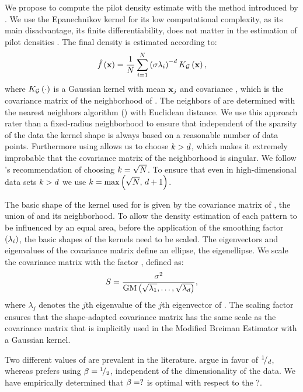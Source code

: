 We propose to compute the pilot density estimate with the method introduced by \citeauthor{wilkinson1995dataplot}. We use the Epanechnikov kernel for its low computational complexity, as its main disadvantage, its finite differentiability, does not matter in the estimation of pilot densities \cite{silverman1986density}. 
The final density is estimated according to:
\begin{equation}
	\varEstimatedDensityFunction{\varPattern} = \frac{1}{\varNumPatterns} \sum_{i = 1}^{\varNumPatterns} \left(\varBandwidth\varLocalBandwidth{i}\right)^{-\varDim} \varKernel[\varGaussian]{\varPattern},
\end{equation}
where $\varKernel[\varGaussian]{\cdot}$ is a Gaussian kernel with mean $\varPattern[j]$ and covariance \varCovarianceMatrix, 
which is the covariance matrix of the neighborhood of \varPattern. The neighbors of \varPattern are determined with the \KNNK nearest neighbors algorithm (\KNN) with Euclidean distance. We use this approach rater than a fixed-radius neighborhood to ensure that independent of the sparsity of the data the kernel shape is always based on a reasonable number of data points. Furthermore using \KNN allows us to choose $k > d$, which makes it extremely improbable that the covariance matrix of the neighborhood is singular. We follow \citeauthor{silverman1986density}'s \cite{silverman1986density} recommendation of choosing $k = \sqrt{N}$. To ensure that even in high-dimensional data sets $k > d$ we use $k = \max\left(\sqrt{N},\, d + 1\right)$.

The basic shape of the kernel used for \varPattern is given by the covariance matrix of \varNeighborhood{\varPattern}, \ie the union of \varPattern and its neighborhood.
To allow the density estimation of each pattern to be influenced by an equal area, before the application of the smoothing factor $(\lambda_{i})$, the basic shapes of the kernels need to be scaled. The eigenvectors and eigenvalues of the covariance matrix define an ellipse, the eigenellipse. We scale the covariance matrix with the factor \varScalingFactor, defined as:
\begin{equation}
	S = \frac{\sigma^2}{\text{GM}\left(\sqrt{\lambda_1}, \dotsc, \sqrt{\lambda_d}\right)},
\end{equation}
where $\lambda_j$ denotes the $j$th eigenvalue of the $j$th eigenvector of \varCovarianceMatrix. The scaling factor \varScalingFactor ensures that the shape-adapted covariance matrix has the same scale as the covariance matrix that is implicitly used in the Modified Breiman Estimator with a Gaussian kernel.

Two different values of \varMBESensitivityParam are prevalent in the literature. \textcite{breiman1977variable} argue in favor of ${}^{1}\!/_{d}$, whereas \textcite{silverman1986density} prefers using $\beta = {}^{1}\!/_{2}$, independent of the dimensionality of the data. We have empirically determined that $\beta = ?$  is optimal with respect to the ?.